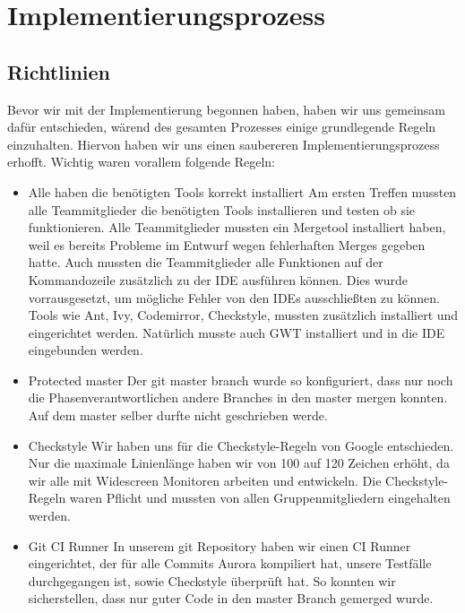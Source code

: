 \documentclass[parskip=full,11pt,twoside]{scrartcl}
\begin{document}
\section{Implementierungsprozess}
\subsection{Richtlinien}
Bevor wir mit der Implementierung begonnen haben, haben wir uns gemeinsam dafür entschieden,
wärend des gesamten Prozesses einige grundlegende Regeln einzuhalten.
Hiervon haben wir uns einen saubereren Implementierungsprozess erhofft.
Wichtig waren vorallem folgende Regeln:
\begin{itemize}
	\item Alle haben die benötigten Tools korrekt installiert
	\newline
	Am ersten Treffen mussten alle Teammitglieder die benötigten Tools installieren und testen ob sie funktionieren.
	Alle Teammitglieder mussten ein Mergetool installiert haben, weil es bereits Probleme im Entwurf wegen fehlerhaften Merges gegeben hatte.
	Auch mussten die Teammitglieder alle Funktionen auf der Kommandozeile zusätzlich 	zu der IDE ausführen können. Dies wurde vorrausgesetzt, um mögliche Fehler von den IDEs ausschließten zu können.
	Tools wie Ant, Ivy, Codemirror, Checkstyle, mussten zusätzlich installiert und eingerichtet werden.
	Natürlich musste auch GWT installiert und in die IDE eingebunden werden.

    \item Protected master
        \newline
        Der git master branch wurde so konfiguriert, dass nur noch die Phasenverantwortlichen andere Branches in den master mergen konnten.
        Auf dem master selber durfte nicht geschrieben werde.
    \item Checkstyle
    \newline
    Wir haben uns für die Checkstyle-Regeln von Google entschieden. Nur die maximale Linienlänge haben wir von 100 auf 120 Zeichen erhöht, da wir alle mit Widescreen Monitoren arbeiten und entwickeln. Die Checkstyle-Regeln waren Pflicht und mussten von allen Gruppenmitgliedern eingehalten werden.
    \item Git CI Runner
        \newline
        In unserem git Repository haben wir einen CI Runner eingerichtet, der für alle Commits Aurora kompiliert hat, unsere Testfälle durchgegangen ist, sowie Checkstyle überprüft hat.
        So konnten wir sicherstellen, dass nur guter Code in den master Branch gemerged wurde.


\end{itemize}
\end{document}
